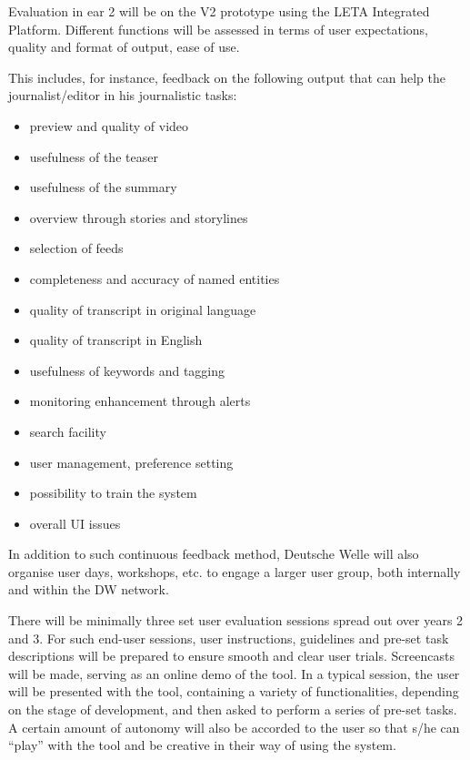 Evaluation in ear 2 will be on the V2 prototype using the LETA Integrated Platform. Different functions will be assessed in terms of user expectations, quality and format of output, ease of use.  

This includes, for instance, feedback on the following \SUMMA output that can help the journalist/editor in his journalistic tasks:

\begin{itemize}
\item preview and quality of video
\item usefulness of the teaser
\item usefulness of the summary
\item overview through stories and storylines
\item selection of feeds
\item completeness and accuracy of named entities
\item quality of transcript in original language
\item quality of transcript in English
\item usefulness of keywords and tagging
\item monitoring enhancement through alerts
\item search facility
\item user management, preference setting
\item possibility to train the system
\item overall UI issues
\end{itemize}

In addition to such continuous feedback method, Deutsche Welle will also organise user days, workshops, etc. to engage a larger user group, both internally and within the DW network. 

There will be minimally three set user evaluation sessions spread out over years 2 and 3. For such end-user sessions, user instructions, guidelines and pre-set task descriptions will be prepared to ensure smooth and clear user trials. Screencasts will be made, serving as an online demo of the tool. In a typical session, the user will be presented with the \SUMMA tool, containing a variety of functionalities, depending on the stage of development, and then asked to perform a series of pre-set tasks. A certain amount of autonomy will also be accorded to the user so that s/he can “play” with the tool and be creative in their way of using the system.

